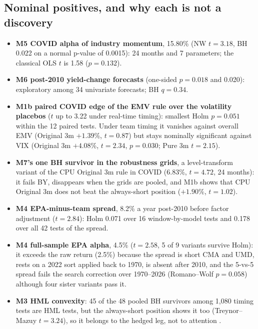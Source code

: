 \subsection{Nominal positives, and why each is not a discovery}
\begin{itemize}
\item \textbf{M5 COVID alpha of industry momentum}, 15.80\% (NW $t=3.18$, BH 0.022 on a normal p-value of 0.0015): 24 months and 7 parameters; the classical OLS $t$ is 1.58 ($p=0.132$).
\item \textbf{M6 post-2010 yield-change forecasts} (one-sided $p=0.018$ and 0.020): exploratory among 34 univariate forecasts; BH $q=0.34$.
\item \textbf{M1b paired COVID edge of the EMV rule over the volatility placebos} ($t$ up to 3.22 under real-time timing): smallest Holm $p=0.051$ within the 12 paired tests. Under team timing it vanishes against overall EMV (Original 3m $+1.39$\%, $t=0.87$) but stays nominally significant against VIX (Original 3m $+4.08$\%, $t=2.34$, $p=0.030$; Pure 3m $t=2.15$).
\item \textbf{M7's one BH survivor in the robustness grids}, a level-transform variant of the CPU Original 3m rule in COVID (6.83\%, $t=4.72$, 24 months): it fails BY, disappears when the grids are pooled, and M1b shows that CPU Original 3m does not beat the always-short position ($+1.90$\%, $t=1.02$).
\item \textbf{M4 EPA-minus-team spread}, 8.2\% a year post-2010 before factor adjustment ($t=2.84$): Holm 0.071 over 16 window-by-model tests and 0.178 over all 42 tests of the spread.
\item \textbf{M4 full-sample EPA alpha}, 4.5\% ($t=2.58$, 5 of 9 variants survive Holm): it exceeds the raw return (2.5\%) because the spread is short CMA and UMD, rests on a 2022 sort applied back to 1970, is absent after 2010, and the 5-vs-5 spread fails the search correction over 1970--2026 (Romano--Wolf $p=0.058$) although four sister variants pass it.
\item \textbf{M3 HML convexity}: 45 of the 48 pooled BH survivors among 1,080 timing tests are HML tests, but the always-short position shows it too (Treynor--Mazuy $t=3.24$), so it belongs to the hedged leg, not to attention \citep{tm1966,hm1981}.
\end{itemize}


